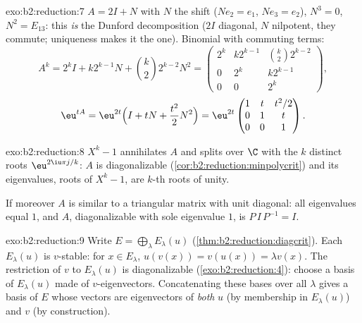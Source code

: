 \begin{solution}{exo:b2:reduction:7}
$A = 2I + N$ with $N$ the shift ($N e_2 = e_1$, $Ne_3 = e_2$),
$N^3 = 0$, $N^2 = E_{13}$: this \emph{is} the Dunford decomposition
($2I$ diagonal, $N$ nilpotent, they commute; uniqueness makes it
the one). Binomial with commuting terms:
\[
A^k = 2^k I + k 2^{k-1} N + \binom k2 2^{k-2} N^2
= \begin{pmatrix}
2^k & k2^{k-1} & \binom k2 2^{k-2}\\
0 & 2^k & k2^{k-1}\\
0 & 0 & 2^k
\end{pmatrix},
\]
\[
\eu^{tA} = \eu^{2t}\Bigl(I + tN + \frac{t^2}{2}N^2\Bigr)
= \eu^{2t}\begin{pmatrix}
1 & t & t^2/2\\
0 & 1 & t\\
0 & 0 & 1
\end{pmatrix}.
\]
\end{solution}

\begin{solution}{exo:b2:reduction:8}
$X^k - 1$ annihilates $A$ and splits over $\C$ with the $k$ distinct
roots $\eu^{2\iu\pi j/k}$: $A$ is diagonalizable
(\cref{cor:b2:reduction:minpolycrit}) and its eigenvalues, roots of
$X^k - 1$, are $k$-th roots of unity.

If moreover $A$ is similar to a triangular matrix with unit
diagonal: all eigenvalues equal $1$, and $A$, diagonalizable with
sole eigenvalue $1$, is $P\,I\,P^{-1} = I$.
\end{solution}

\begin{solution}{exo:b2:reduction:9}
Write $E = \bigoplus_\lambda E_\lambda(u)$
(\cref{thm:b2:reduction:diagcrit}). Each $E_\lambda(u)$ is
$v$-stable: for $x \in E_\lambda$, $u(v(x)) = v(u(x)) = \lambda
v(x)$. The restriction of $v$ to $E_\lambda(u)$ is diagonalizable
(\cref{exo:b2:reduction:4}): choose a basis of $E_\lambda(u)$ made
of $v$-eigenvectors. Concatenating these bases over all $\lambda$
gives a basis of $E$ whose vectors are eigenvectors of \emph{both}
$u$ (by membership in $E_\lambda(u)$) and $v$ (by construction).
\end{solution}

